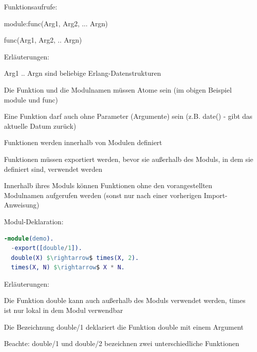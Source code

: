 \documentclass[10pt]{article}
\begin{document}
Funktionsaufrufe:
\begin{itemize*}
  \item module:func(Arg1, Arg2, ... Argn)
  \item func(Arg1, Arg2, .. Argn)
  \item Erläuterungen:
  \begin{itemize*}
    \item Arg1 .. Argn sind beliebige Erlang-Datenstrukturen
    \item Die Funktion und die Modulnamen müssen Atome sein (im obigen Beispiel module und func)
    \item Eine Funktion darf auch ohne Parameter (Argumente) sein (z.B. date() - gibt das aktuelle Datum zurück)
    \item Funktionen werden innerhalb von Modulen definiert
    \item Funktionen müssen exportiert werden, bevor sie außerhalb des Moduls, in dem sie definiert sind, verwendet werden
    \item Innerhalb ihres Moduls können Funktionen ohne den vorangestellten Modulnamen aufgerufen werden (sonst nur nach einer vorherigen Import-Anweisung)
  \end{itemize*}
\end{itemize*}

Modul-Deklaration:
\begin{lstlisting}[language=erlang]
  -module(demo).
  -export([double/1]).
  double(X) $\rightarrow$ times(X, 2).
  times(X, N) $\rightarrow$ X * N.
\end{lstlisting}
\begin{itemize*}
  \item Erläuterungen:
  \item Die Funktion double kann auch außerhalb des Moduls verwendet werden, times ist nur lokal in dem Modul verwendbar
  \item Die Bezeichnung double/1 deklariert die Funktion double mit einem Argument
  \item Beachte: double/1 und double/2 bezeichnen zwei unterschiedliche Funktionen
\end{itemize*}
\end{document}
